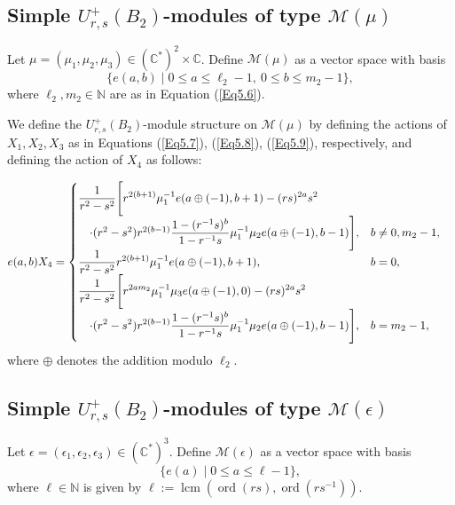 \documentclass[12 pt,reqno]{amsart}
\numberwithin{equation}{section}
\DeclareMathOperator{\ord}{ord}
\theoremstyle{definition}
\theoremstyle{definition}
\theoremstyle{remark}
\theoremstyle{remark}
\begin{document}
\subsection{\texorpdfstring{Simple $ U_{r,s}^+(B_2) $-modules of type $ \mathcal{M}(\mu) $}{}}

Let $ \mu = (\mu_1, \mu_2, \mu_3) \in (\mathbb{C}^*)^2 \times \mathbb{C} $. 
Define $ \mathcal{M}(\mu) $ as a vector space with basis  
$$
    \{ e(a, b) \mid 0 \leq a \leq \ell_2 - 1, \ 0 \leq b \leq m_2 - 1 \},
$$  
where $ \ell_2, m_2 \in \mathbb{N} $ are as in Equation (\ref{Eq5.6}).  

\noindent We define the $ U_{r,s}^+(B_2) $-module structure on $ \mathcal{M}(\mu) $ by defining the actions of $X_1, X_2, X_3$ as in Equations (\ref{Eq5.7}), (\ref{Eq5.8}), (\ref{Eq5.9}), respectively, and defining the action of $X_4$ as follows:
    
    \begin{align*}
    e(a,b)X_4 &= 
     \begin{cases}
        \displaystyle \displaystyle\frac{1}{r^2 - s^2} \Bigg[ 
            r^{2(b+1)} \mu_1^{-1}e(a \oplus (-1), b+1)-(rs)^{2a}s^2\\ \quad\cdot (r^2 - s^2)r^{2(b-1)}
            \displaystyle
            \frac{1 - (r^{-1}s)^b}{1 - r^{-1}s}\mu_1^{-1}\mu_2 e(a \oplus (-1), b-1)  
        \Bigg],  
        &  b \neq 0, m_2 - 1, \\
 \displaystyle\frac{1}{r^2 - s^2} r^{2(b+1)} \mu_1^{-1}e(a \oplus (-1), b+1),  
        &  b = 0, \\
 \displaystyle\frac{1}{r^2 - s^2} \Bigg[ 
            r^{2am_2} \mu_1^{-1} \mu_3e(a \oplus (-1), 0)  -(rs)^{2a}s^2 \\ \quad  \cdot \displaystyle(r^2 - s^2)r^{2(b-1)}  
            \frac{1 - (r^{-1}s)^b}{1 - r^{-1}s}\mu_1^{-1}\mu_2 e(a \oplus (-1), b-1)  
        \Bigg],  
        & b = m_2 - 1,
    \end{cases}
\end{align*}
where $\oplus$ denotes the addition modulo $\ell_2$.
\subsection{\texorpdfstring{Simple $ U_{r,s}^+(B_2) $-modules of type $ \mathcal{M}(\epsilon) $}{}} Let $ \epsilon = (\epsilon_1, \epsilon_2, \epsilon_3) \in (\mathbb{C}^*)^3 $. 
Define $ \mathcal{M}(\epsilon) $ as a vector space with basis  
$$
    \{ e(a) \mid 0 \leq a \leq \ell - 1\},
$$  
where $ \ell \in \mathbb{N} $ is given by $\ell:= \operatorname{lcm}(\ord(rs),\ord(rs^{-1}))$. 
\end{document}
